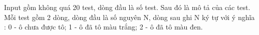 Input gồm không quá 20 test, dòng đầu là số test. Sau đó là mô tả của các test.   
\\   Mỗi test gồm 2 dòng, dòng đầu là số nguyên N, dòng sau ghi N ký tự với ý nghĩa : 0 - ô chưa được tô; 1 - ô đã tô màu trắng; 2 - ô đã tô màu đen.  

\